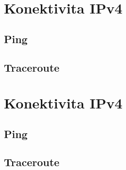 \documentclass[czech,master,dept460,male,cpp,cpdeclaration]{diploma}
\begin{document}
\newpage
\section{Konektivita IPv4}
\label{sec:Sec11}

\subsection{Ping}
\label{sec:Sec111}

\subsection{Traceroute}
\label{sec:Sec111}

\newpage
\section{Konektivita IPv4}
\label{sec:Sec11}

\subsection{Ping}
\label{sec:Sec111}

\subsection{Traceroute}
\label{sec:Sec111}
\end{document}
